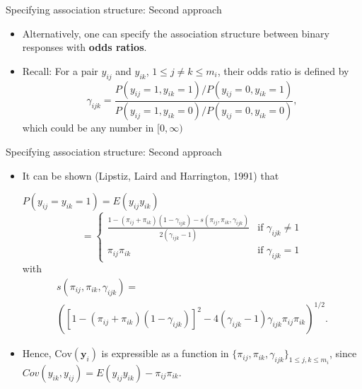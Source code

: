 \documentclass{beamer}
\newenvironment{wideitemize}%
  {\begin{itemize}%
    \setlength{\parskip}{1em}}%
  {\end{itemize}}
\begin{document}
\begin{frame}{\large Specifying association structure: Second approach}


\begin{wideitemize}
\item Alternatively, one can specify the association structure between binary responses with {\bf odds ratios}. 


\item  Recall:  For a pair $y_{ij}$ and $y_{ik}$, $ 1\leq j\neq k \leq m_i$, their odds ratio is defined by
\[
\gamma_{ijk}=\frac{P(y_{ij}=1, y_{ik}=1)/ P(y_{ij}=0, y_{ik}=1)  }{
P(y_{ij}=1, y_{ik}=0)/ P(y_{ij}=0, y_{ik}=0) },
\]
which could be any number in $[0, \infty)$

\end{wideitemize}
\end{frame}


\begin{frame}{ \large Specifying association structure: Second approach}
\begin{wideitemize}
\item 
 It can be shown (Lipstiz, Laird and Harrington, 1991)  that 

 
 $P(y_{ij}=y_{ik}=1)=E(y_{ij}y_{ik})$ 
\begin{equation}
= 
\left\{\begin{array}{lc} \frac{1-(\pi_{ij}+\pi_{ik})
(1-\gamma_{ijk})-s(\pi_{ij},\pi_{ik},\gamma_{ijk})}{2(\gamma_{ijk}-1)} & \mbox{if $\gamma_{ijk}\neq 1$} 
\\ \pi_{ij}\pi_{ik} &  \mbox{if $\gamma_{ijk}= 1$} \end{array}\right.
\label{eq-3.5.10}
\end{equation}
with 
\begin{multline*}
s(\pi_{ij},\pi_{ik},\gamma_{ijk})=\\
\left(\left[1\!-\!(\pi_{ij}\!+\!\pi_{ik})(1\!-\!\gamma_{ijk})\right]^2-
4(\gamma_{ijk}\!-\!1)\gamma_{ijk}\pi_{ij}\pi_{ik}\right)^{1/2}.
\end{multline*} 
\item
Hence, $\text{Cov}(\textbf{y}_i)$ is expressible
as a function in $\{\pi_{ij}, \pi_{ik}, \gamma_{ijk}\}_{1 \leq j, k \leq m_i}$, since $Cov(y_{ik}, y_{ij}) = E(y_{ij} y_{ik}) - \pi_{ij} \pi_{ik}$. 



\end{wideitemize}
\end{frame}
\end{document}
